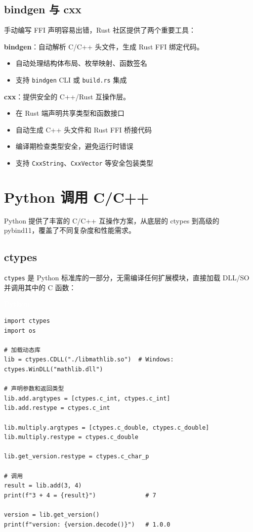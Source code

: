 \documentclass[12pt,a4paper,fontset=fandol]{ctexbook}
\newcommand{\pythonlabel}{%
  \begin{tcolorbox}[enhanced,colback=pythonheadbg,colframe=pythonheadbg,
    arc=1mm,boxrule=0mm,left=6pt,right=6pt,top=2pt,bottom=2pt,
    halign=left,oversize]
    \textcolor{white}{\small\bfseries Python}
  \end{tcolorbox}\vspace{-4pt}}
\newcommand{\cpp}[1]{C++#1}
\newcommand{\Tp}[1]{\texttt{#1}}
\begin{document}
\section{bindgen 与 cxx}

手动编写 FFI 声明容易出错，Rust 社区提供了两个重要工具：

\textbf{bindgen}：自动解析 C/\allowbreak{}\cpp{} 头文件，生成 Rust FFI 绑定代码。
\begin{itemize}[nosep]
\item 自动处理结构体布局、枚举映射、函数签名
\item 支持 \texttt{bindgen} CLI 或 \texttt{build.rs} 集成
\end{itemize}

\textbf{cxx}：提供安全的 \cpp{}/Rust 互操作层。
\begin{itemize}[nosep]
\item 在 Rust 端声明共享类型和函数接口
\item 自动生成 \cpp{} 头文件和 Rust FFI 桥接代码
\item 编译期检查类型安全，避免运行时错误
\item 支持 \Tp{CxxString}、\Tp{CxxVector} 等安全包装类型
\end{itemize}


\chapter{Python 调用 C/C++}

Python 提供了丰富的 C/\allowbreak{}\cpp{} 互操作方案，从底层的 ctypes 到高级的 pybind11，覆盖了不同复杂度和性能需求。

\section{ctypes}

\texttt{ctypes} 是 Python 标准库的一部分，无需编译任何扩展模块，直接加载 DLL/SO 并调用其中的 C 函数：

\pythonlabel
\begin{lstlisting}[style=pythonstyle]
import ctypes
import os

# 加载动态库
lib = ctypes.CDLL("./libmathlib.so")  # Windows: ctypes.WinDLL("mathlib.dll")

# 声明参数和返回类型
lib.add.argtypes = [ctypes.c_int, ctypes.c_int]
lib.add.restype = ctypes.c_int

lib.multiply.argtypes = [ctypes.c_double, ctypes.c_double]
lib.multiply.restype = ctypes.c_double

lib.get_version.restype = ctypes.c_char_p

# 调用
result = lib.add(3, 4)
print(f"3 + 4 = {result}")              # 7

version = lib.get_version()
print(f"version: {version.decode()}")   # 1.0.0
\end{lstlisting}
\end{document}
